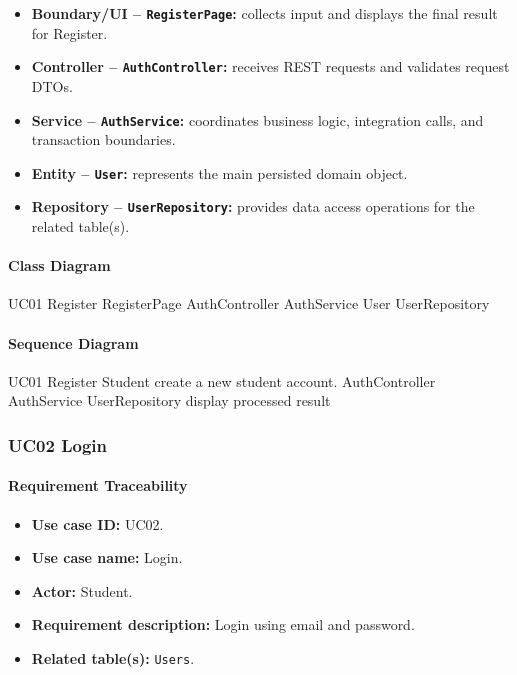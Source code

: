 \begin{itemize}
    \item \textbf{Boundary/UI -- \texttt{RegisterPage}:} collects input and displays the final result for Register.
    \item \textbf{Controller -- \texttt{AuthController}:} receives REST requests and validates request DTOs.
    \item \textbf{Service -- \texttt{AuthService}:} coordinates business logic, integration calls, and transaction boundaries.
    \item \textbf{Entity -- \texttt{User}:} represents the main persisted domain object.
    \item \textbf{Repository -- \texttt{UserRepository}:} provides data access operations for the related table(s).
\end{itemize}

\paragraph{Class Diagram}

\ClassDiagram
{UC01 Register}
{RegisterPage}
{AuthController}
{AuthService}
{User}
{UserRepository}

\paragraph{Sequence Diagram}

\SequenceDiagram
{UC01 Register}
{Student}
{create a new student account.}
{AuthController}
{AuthService}
{UserRepository}
{display processed result}

\subsubsection{UC02 Login}

\paragraph{Requirement Traceability}

\begin{itemize}
    \item \textbf{Use case ID:} UC02.
    \item \textbf{Use case name:} Login.
    \item \textbf{Actor:} Student.
    \item \textbf{Requirement description:} Login using email and password.
    \item \textbf{Related table(s):} \texttt{Users}.
\end{itemize}

